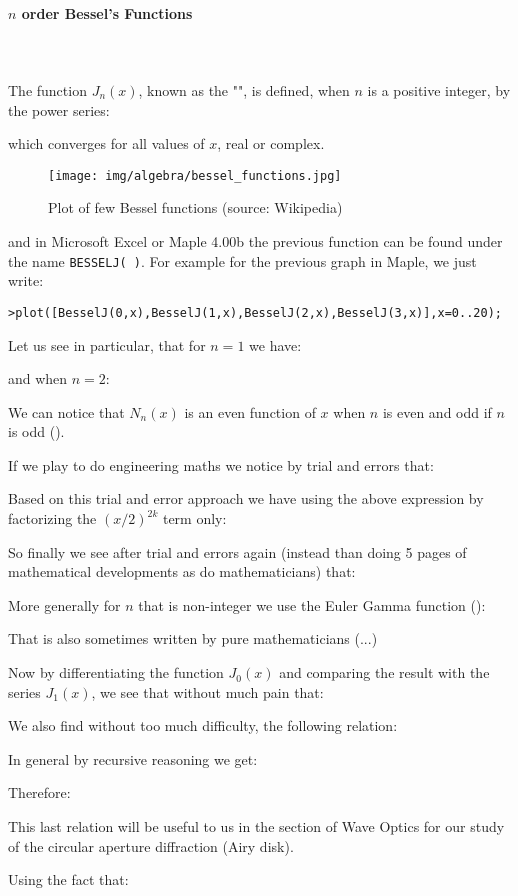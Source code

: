 	\paragraph{$n$ order Bessel's Functions}\mbox{}\\\\
	The function $J_n(x)$, known as the "", is defined, when $n$ is a positive integer, by the power series:
	
	which converges for all values of $x$, real or complex.
	\begin{figure}[H]
		\centering
		\texttt{[image: img/algebra/bessel\_functions.jpg]}
		\caption{Plot of few Bessel functions (source: Wikipedia)}
	\end{figure}
	and in Microsoft Excel or Maple 4.00b the previous function can be found under the name \texttt{BESSELJ( )}. For example for the previous graph in Maple, we just write:
	
	\texttt{>plot([BesselJ(0,x),BesselJ(1,x),BesselJ(2,x),BesselJ(3,x)],x=0..20);}
	
	Let us see in particular, that for $n=1$ we have:
	
	and when $n=2$:
	
	We can notice that $N_n(x)$ is an even function of $x$ when $n$ is even and odd if $n$ is odd ().
	
	If we play to do engineering maths we notice by trial and errors that:
	
	Based on this trial and error approach we have using the above expression by factorizing the $(x/2)^{2k}$ term only:
	
	So finally we see after trial and errors again (instead than doing 5 pages of mathematical developments as do mathematicians) that:
	
	More generally for $n$ that is non-integer we use the Euler Gamma function ():
	
	That is also sometimes written by pure mathematicians (...)
	
	Now by differentiating the function $J_0(x)$ and comparing the result with the series $J_1(x)$, we see that without much pain that:
	
	We also find without too much difficulty, the following relation:
	 
	\begin{tcolorbox}[title=Remark,colframe=black,arc=10pt]
	In general by recursive reasoning we get:
	
	Therefore:
	
	This last relation will be useful to us in the section of Wave Optics for our study of the circular aperture diffraction (Airy disk).
	\end{tcolorbox}
	Using the fact that:
	
